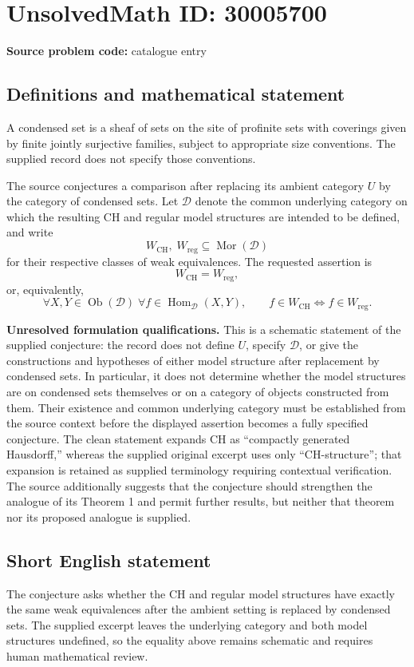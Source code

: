 \documentclass[11pt]{article}
\begin{document}
\section*{UnsolvedMath ID: 30005700}
\textbf{Source problem code:} catalogue entry
\subsection{Definitions and mathematical statement}
A condensed set is a sheaf of sets on the site of profinite sets with coverings given by finite jointly surjective families, subject to appropriate size conventions. The supplied record does not specify those conventions.

The source conjectures a comparison after replacing its ambient category \(U\) by the category of condensed sets. Let \(\mathcal D\) denote the common underlying category on which the resulting CH and regular model structures are intended to be defined, and write
\[
W_{\mathrm{CH}},\;W_{\mathrm{reg}}\subseteq\operatorname{Mor}(\mathcal D)
\]
for their respective classes of weak equivalences. The requested assertion is
\[
W_{\mathrm{CH}}=W_{\mathrm{reg}},
\]
or, equivalently,
\[
\forall X,Y\in\operatorname{Ob}(\mathcal D)\;\forall f\in\operatorname{Hom}_{\mathcal D}(X,Y),\qquad
f\in W_{\mathrm{CH}}\iff f\in W_{\mathrm{reg}}.
\]

\textbf{Unresolved formulation qualifications.} This is a schematic statement of the supplied conjecture: the record does not define \(U\), specify \(\mathcal D\), or give the constructions and hypotheses of either model structure after replacement by condensed sets. In particular, it does not determine whether the model structures are on condensed sets themselves or on a category of objects constructed from them. Their existence and common underlying category must be established from the source context before the displayed assertion becomes a fully specified conjecture. The clean statement expands CH as ``compactly generated Hausdorff,'' whereas the supplied original excerpt uses only ``CH-structure''; that expansion is retained as supplied terminology requiring contextual verification. The source additionally suggests that the conjecture should strengthen the analogue of its Theorem 1 and permit further results, but neither that theorem nor its proposed analogue is supplied.
\subsection{Short English statement}
The conjecture asks whether the CH and regular model structures have exactly the same weak equivalences after the ambient setting is replaced by condensed sets. The supplied excerpt leaves the underlying category and both model structures undefined, so the equality above remains schematic and requires human mathematical review.
\end{document}

